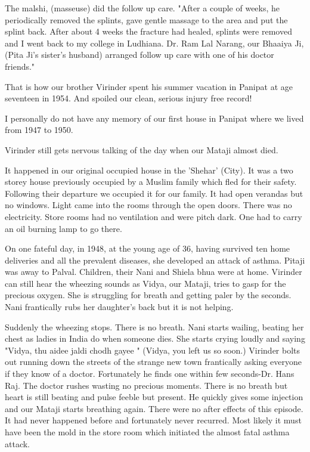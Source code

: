 The malshi, (masseuse) did the follow up care. "After a couple of weeks,
he periodically removed the splints, gave gentle massage to the area and
put the splint back. After about 4 weeks the fracture had healed, splints
were removed and I went back to my college in Ludhiana. Dr. Ram Lal
Narang, our Bhaaiya Ji, (Pita Ji’s sister's husband) arranged follow up
care with one of his doctor friends."

That is how our brother Virinder spent his summer vacation in Panipat at
age seventeen in 1954. And spoiled our clean, serious injury free record! 

I personally do not have any memory of our first house in Panipat where we
lived from 1947 to 1950. 

Virinder still gets nervous talking of the day when our Mataji almost
died. 

It happened in our original occupied house in the 'Shehar' (City). It was
a two storey house previously occupied by a Muslim family which fled for
their safety. Following their departure we occupied it for our family. It
had open verandas but no windows. Light came into the rooms through the
open doors. There was no electricity. Store rooms had no ventilation and
were pitch dark. One had to carry an oil burning lamp to go there. 

On one fateful day, in 1948, at the young age of 36, having survived ten
home deliveries and all the prevalent diseases, she developed an attack of
asthma. Pitaji was away to Palval. Children, their Nani and Shiela bhua
were at home. Virinder can still hear the wheezing sounds as Vidya, our
Mataji, tries to gasp for the precious oxygen. She is struggling for
breath and getting paler by the seconds. Nani frantically rubs her
daughter's back but it is not helping. 

Suddenly the wheezing stops. There is no breath. Nani starts wailing,
beating her chest as ladies in India do when someone dies. She starts
crying loudly and saying "Vidya, thu aidee jaldi chodh gayee " (Vidya, you
left us so soon.) Virinder bolts out running down the streets of the
strange new town frantically asking everyone if they know of a doctor.
Fortunately he finds one within few seconds-Dr. Hans Raj. The doctor
rushes wasting no precious moments. There is no breath but heart is still
beating and pulse feeble but present. He quickly gives some injection and
our Mataji starts breathing again. There were no after effects of this
episode. It had never happened before and fortunately never recurred. Most
likely it must have been the mold in the store room which initiated the
almost fatal asthma attack. 

